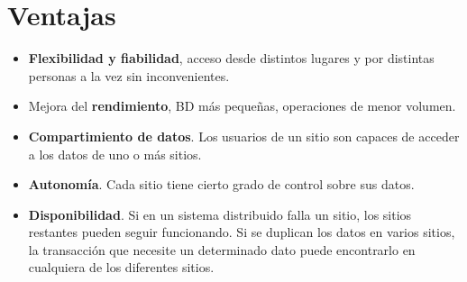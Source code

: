 \documentclass[10pt,a4paper,oneside]{article}
\begin{document}
\section{Ventajas\cite {Olarte}}
\begin {itemize}
\item {\bf Flexibilidad y fiabilidad}, acceso desde distintos lugares y por distintas personas a la vez sin inconvenientes.
\item Mejora del {\bf rendimiento}, BD m\'as peque\~nas, operaciones de menor volumen.
\item {\bf Compartimiento de datos}. Los usuarios de un sitio son capaces de acceder a los datos de uno o m\'as sitios.
\item {\bf Autonom\'ia}. Cada sitio tiene cierto grado de control sobre sus datos.
\item {\bf Disponibilidad}. Si en un sistema distribuido falla un sitio, los sitios restantes pueden seguir funcionando. Si se duplican los datos en varios sitios, la transacci\'on que necesite un determinado dato puede encontrarlo en cualquiera de los diferentes sitios.
\end {itemize}
\end{document}
